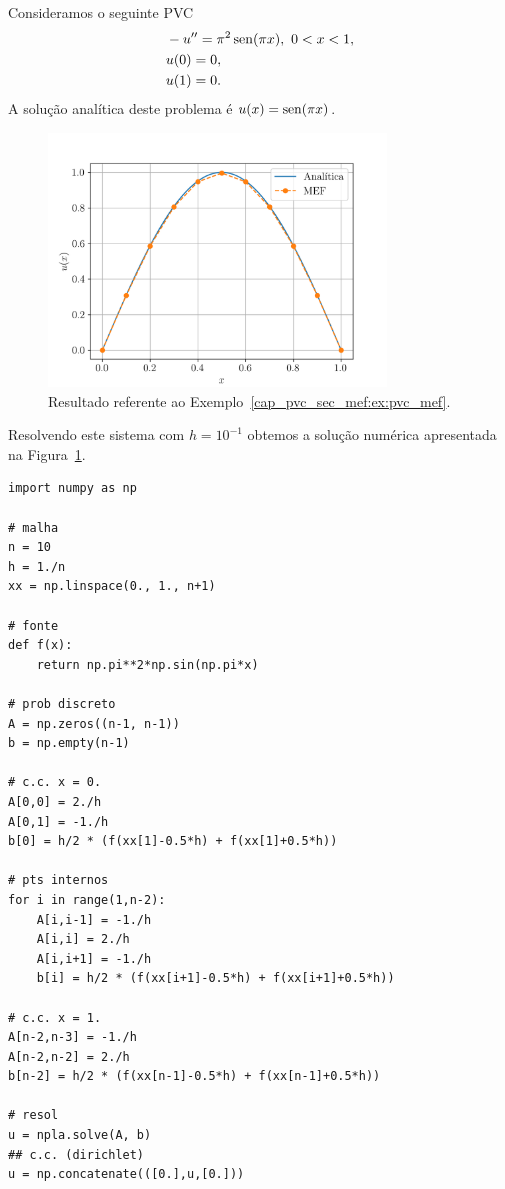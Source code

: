 \begin{ex}\label{cap_pvc_sec_mef:ex:pvc_mef}
  Consideramos o seguinte PVC
  \begin{align}
    &-u'' = \pi^2\operatorname{sen}(\pi x), ~0 < x < 1,\\
    &u(0) = 0,\\
    &u(1) = 0.
  \end{align}
  A solução analítica deste problema é $u(x) = \operatorname{sen}(\pi x)$.
  
  \begin{figure}[h!]
    \centering
    \includegraphics[width=0.8\textwidth]{./cap_pvc/dados/fig_mef/fig}
    \caption{Resultado referente ao Exemplo~\ref{cap_pvc_sec_mef:ex:pvc_mef}.}
    \label{cap_pvc_sec_mef:fig:ex_pvc_mef}
  \end{figure}

Resolvendo este sistema com $h=10^{-1}$ obtemos a solução numérica apresentada na Figura~\ref{cap_pvc_sec_mef:fig:ex_pvc_mef}.

\begin{lstlisting}[caption=pvc\_mef.py]
import numpy as np

# malha
n = 10
h = 1./n
xx = np.linspace(0., 1., n+1)

# fonte
def f(x):
    return np.pi**2*np.sin(np.pi*x)

# prob discreto
A = np.zeros((n-1, n-1))
b = np.empty(n-1)

# c.c. x = 0.
A[0,0] = 2./h
A[0,1] = -1./h
b[0] = h/2 * (f(xx[1]-0.5*h) + f(xx[1]+0.5*h))

# pts internos
for i in range(1,n-2):
    A[i,i-1] = -1./h
    A[i,i] = 2./h
    A[i,i+1] = -1./h
    b[i] = h/2 * (f(xx[i+1]-0.5*h) + f(xx[i+1]+0.5*h))

# c.c. x = 1.
A[n-2,n-3] = -1./h
A[n-2,n-2] = 2./h
b[n-2] = h/2 * (f(xx[n-1]-0.5*h) + f(xx[n-1]+0.5*h))

# resol
u = npla.solve(A, b)
## c.c. (dirichlet)
u = np.concatenate(([0.],u,[0.]))
\end{lstlisting}
\end{ex}

